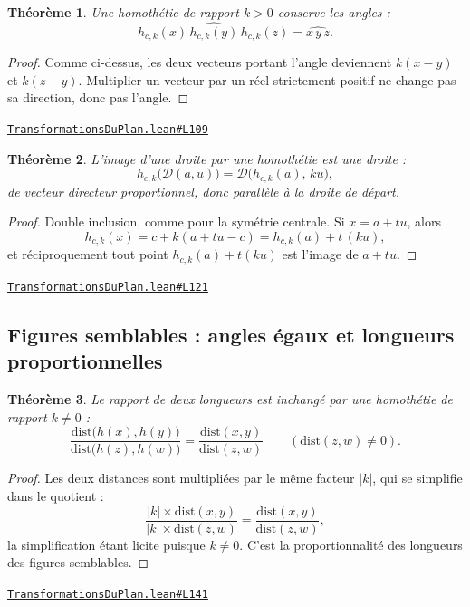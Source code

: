 \documentclass[11pt,a4paper]{article}
\theoremstyle{definition}
\theoremstyle{plain}
\newtheorem{theoreme}{Théorème}
\newcommand{\source}[2]{\par\smallskip\noindent\hfill{\footnotesize\href{#1}{\texttt{#2}}}\par\smallskip}
\begin{document}
\begin{theoreme}
Une homothétie de rapport $k > 0$ conserve les angles :
\[ \widehat{h_{c,k}(x)\,h_{c,k}(y)\,h_{c,k}(z)} = \widehat{x\,y\,z} . \]
\end{theoreme}

\begin{proof}
Comme ci-dessus, les deux vecteurs portant l'angle deviennent $k(x - y)$ et $k(z - y)$.
Multiplier un vecteur par un réel strictement positif ne change pas sa direction, donc
pas l'angle.
\end{proof}
\source{https://github.com/Commutator-IO/learn-lean/blob/main/cours/01-college/03-transformations-du-plan/TransformationsDuPlan.lean\#L109}{TransformationsDuPlan.lean\#L109}

\begin{theoreme}
L'image d'une droite par une homothétie est une droite :
\[ h_{c,k}\bigl(\mathcal{D}(a, u)\bigr)
   = \mathcal{D}\bigl(h_{c,k}(a),\, ku\bigr) , \]
de vecteur directeur proportionnel, donc parallèle à la droite de départ.
\end{theoreme}

\begin{proof}
Double inclusion, comme pour la symétrie centrale. Si $x = a + tu$, alors
\[ h_{c,k}(x) = c + k(a + tu - c) = h_{c,k}(a) + t\,(ku) , \]
et réciproquement tout point $h_{c,k}(a) + t(ku)$ est l'image de $a + tu$.
\end{proof}
\source{https://github.com/Commutator-IO/learn-lean/blob/main/cours/01-college/03-transformations-du-plan/TransformationsDuPlan.lean\#L121}{TransformationsDuPlan.lean\#L121}

\subsection{Figures semblables : angles égaux et longueurs proportionnelles}

\begin{theoreme}
Le rapport de deux longueurs est inchangé par une homothétie de rapport
$k \ne 0$ :
\[ \frac{\mathrm{dist}\bigl(h(x), h(y)\bigr)}{\mathrm{dist}\bigl(h(z), h(w)\bigr)}
   = \frac{\mathrm{dist}(x, y)}{\mathrm{dist}(z, w)} \qquad (\mathrm{dist}(z,w) \ne 0) . \]
\end{theoreme}

\begin{proof}
Les deux distances sont multipliées par le même facteur $|k|$, qui se simplifie dans le
quotient :
\[ \frac{|k| \times \mathrm{dist}(x,y)}{|k| \times \mathrm{dist}(z,w)}
   = \frac{\mathrm{dist}(x,y)}{\mathrm{dist}(z,w)} , \]
la simplification étant licite puisque $k \ne 0$. C'est la proportionnalité des longueurs
des figures semblables.
\end{proof}
\source{https://github.com/Commutator-IO/learn-lean/blob/main/cours/01-college/03-transformations-du-plan/TransformationsDuPlan.lean\#L141}{TransformationsDuPlan.lean\#L141}
\end{document}
